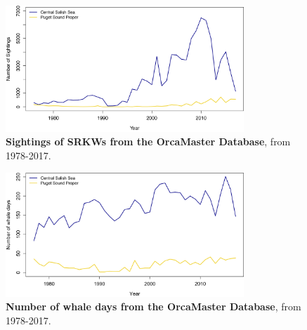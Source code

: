 \documentclass{article}
\begin{document}
\newpage
\begin{figure}[h!]
\includegraphics[width=0.8\textwidth]{../analyses/figures/OrcaPhenPlots/numsights_1976_2regs.png} 
\caption{\textbf{Sightings of SRKWs from the OrcaMaster Database}, from 1978-2017. }
\label{fig:sights}
\end{figure}

\begin{figure}[h!]
\includegraphics[width=0.8\textwidth]{../analyses/figures/OrcaPhenPlots/whaledays_assumeSRKW2regs.png} 
\caption{\textbf{Number of whale days from the OrcaMaster Database}, from 1978-2017. }
\label{fig:wdays}
\end{figure}
\end{document}
